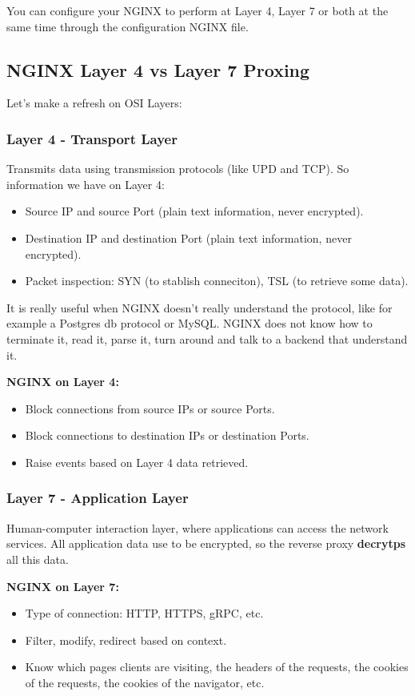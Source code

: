 \documentclass{article}
\begin{document}
You can configure your NGINX to perform at Layer 4, Layer 7 or both at the same time through the configuration NGINX file.

\subsection{NGINX Layer 4 vs Layer 7 Proxing}
Let's make a refresh on OSI Layers:

\subsubsection{Layer 4 - Transport Layer}

Transmits data using transmission protocols (like UPD and TCP). So information we have on Layer 4:
\begin{itemize}
    \item Source IP and source Port (plain text information, never encrypted).
    \item Destination IP and destination Port (plain text information, never encrypted).
    \item Packet inspection: SYN (to stablish conneciton), TSL (to retrieve some data).
\end{itemize}

It is really useful when NGINX doesn't really understand the protocol, like for example a Postgres db protocol or MySQL. NGINX does not know how to terminate it, read it, parse it, turn around and talk to a backend that understand it.

\textbf{NGINX on Layer 4:}
\begin{itemize}
    \item Block connections from source IPs or source Ports.
    \item Block connections to destination IPs or destination Ports.
    \item Raise events based on Layer 4 data retrieved.
\end{itemize}

\subsubsection{Layer 7 - Application Layer}
Human-computer interaction layer, where applications can access the network services. All application data use to be encrypted, so the reverse proxy \textbf{decrytps} all this data.

\textbf{NGINX on Layer 7:}
\begin{itemize}
    \item Type of connection: HTTP, HTTPS, gRPC, etc.
    \item Filter, modify, redirect based on context.
    \item Know which pages clients are visiting, the headers of the requests, the cookies of the requests, the cookies of the navigator, etc.
\end{itemize}
\end{document}
